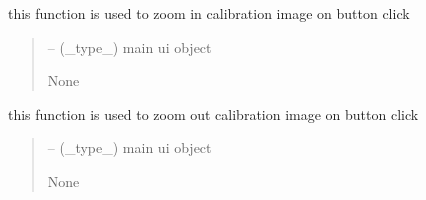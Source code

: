 \documentclass[letterpaper,10pt,english]{sphinxmanual}
\begin{document}
\begin{savenotes}\begin{fulllineitems}
\label{\detokenize{setting/backend/camera_funcs:oxin.backend.camera_funcs.zoom_in_calibration_image}}
\pysigstartsignatures
{}
\pysigstopsignatures
\sphinxAtStartPar
this function is used to zoom in calibration image on button click
\begin{quote}\begin{description}
\sphinxAtStartPar
{} – (\_type\_) main ui object

\sphinxAtStartPar
None

\end{description}\end{quote}

\end{fulllineitems}\end{savenotes}


\begin{savenotes}\begin{fulllineitems}
\label{\detokenize{setting/backend/camera_funcs:oxin.backend.camera_funcs.zoom_out_calibration_image}}
\pysigstartsignatures
{}
\pysigstopsignatures
\sphinxAtStartPar
this function is used to zoom out calibration image on button click
\begin{quote}\begin{description}
\sphinxAtStartPar
{} – (\_type\_) main ui object

\sphinxAtStartPar
None

\end{description}\end{quote}

\end{fulllineitems}\end{savenotes}
\end{document}

